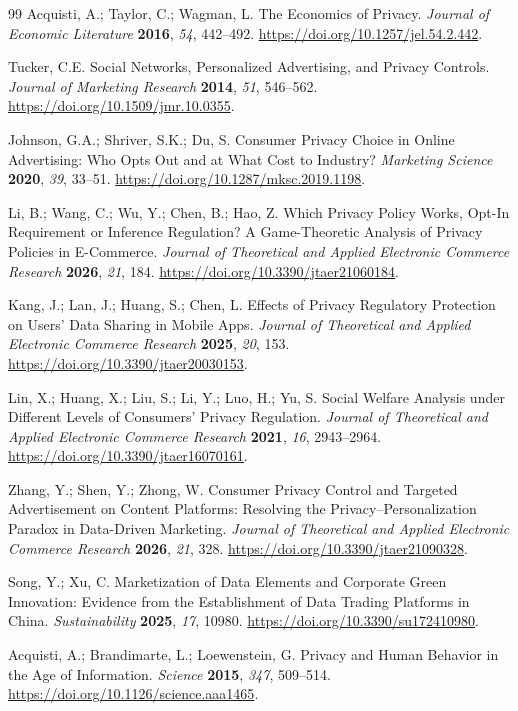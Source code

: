 \begin{thebibliography}{99}
Acquisti, A.; Taylor, C.; Wagman, L. The Economics of Privacy. \textit{Journal of Economic Literature} \textbf{2016}, \textit{54}, 442--492. \url{https://doi.org/10.1257/jel.54.2.442}.

Tucker, C.E. Social Networks, Personalized Advertising, and Privacy Controls. \textit{Journal of Marketing Research} \textbf{2014}, \textit{51}, 546--562. \url{https://doi.org/10.1509/jmr.10.0355}.

Johnson, G.A.; Shriver, S.K.; Du, S. Consumer Privacy Choice in Online Advertising: Who Opts Out and at What Cost to Industry? \textit{Marketing Science} \textbf{2020}, \textit{39}, 33--51. \url{https://doi.org/10.1287/mksc.2019.1198}.

Li, B.; Wang, C.; Wu, Y.; Chen, B.; Hao, Z. Which Privacy Policy Works, Opt-In Requirement or Inference Regulation? A Game-Theoretic Analysis of Privacy Policies in E-Commerce. \textit{Journal of Theoretical and Applied Electronic Commerce Research} \textbf{2026}, \textit{21}, 184. \url{https://doi.org/10.3390/jtaer21060184}.

Kang, J.; Lan, J.; Huang, S.; Chen, L. Effects of Privacy Regulatory Protection on Users' Data Sharing in Mobile Apps. \textit{Journal of Theoretical and Applied Electronic Commerce Research} \textbf{2025}, \textit{20}, 153. \url{https://doi.org/10.3390/jtaer20030153}.

Lin, X.; Huang, X.; Liu, S.; Li, Y.; Luo, H.; Yu, S. Social Welfare Analysis under Different Levels of Consumers' Privacy Regulation. \textit{Journal of Theoretical and Applied Electronic Commerce Research} \textbf{2021}, \textit{16}, 2943--2964. \url{https://doi.org/10.3390/jtaer16070161}.

Zhang, Y.; Shen, Y.; Zhong, W. Consumer Privacy Control and Targeted Advertisement on Content Platforms: Resolving the Privacy--Personalization Paradox in Data-Driven Marketing. \textit{Journal of Theoretical and Applied Electronic Commerce Research} \textbf{2026}, \textit{21}, 328. \url{https://doi.org/10.3390/jtaer21090328}.

Song, Y.; Xu, C. Marketization of Data Elements and Corporate Green Innovation: Evidence from the Establishment of Data Trading Platforms in China. \textit{Sustainability} \textbf{2025}, \textit{17}, 10980. \url{https://doi.org/10.3390/su172410980}.

Acquisti, A.; Brandimarte, L.; Loewenstein, G. Privacy and Human Behavior in the Age of Information. \textit{Science} \textbf{2015}, \textit{347}, 509--514. \url{https://doi.org/10.1126/science.aaa1465}.


\end{thebibliography}

